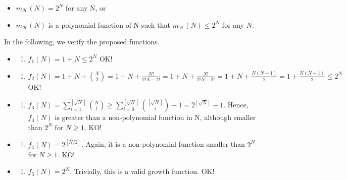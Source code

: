 \documentclass[11pt]{article}
\providecommand{\tightlist}{%
      \setlength{\itemsep}{0pt}\setlength{\parskip}{0pt}}
\begin{document}
\begin{itemize}
\tightlist
\item
  \(m_{\mathcal{H}}(N)= 2^N\) for any N, or
\item
  \(m_{\mathcal{H}}(N)\) is a polynomial function of N such that
  \(m_{\mathcal{H}}(N)\le 2^N\) for any \(N\).
\end{itemize}

In the following, we verify the proposed functions.

\begin{itemize}
\item
  \begin{enumerate}
  \def\labelenumi{\roman{enumi})}
  \tightlist
  \item
    \(f_1(N)=1+N \le 2^N\) OK!
  \end{enumerate}
\item
  \begin{enumerate}
  \def\labelenumi{\roman{enumi})}
  \setcounter{enumi}{1}
  \tightlist
  \item
    \(f_2(N)=1+N+{N\choose 2}=1+N+\frac{N!}{2!N-2!}=1+N+\frac{N!}{2!N-2!}=1+N+\frac{N(N-1)}{2}=1+\frac{N(N+1)}{2}\le 2^N\)
    OK!
  \end{enumerate}
\item
  \begin{enumerate}
  \def\labelenumi{\roman{enumi})}
  \setcounter{enumi}{2}
  \tightlist
  \item
    \(f_3(N)=\sum^{[\sqrt{N}]}_{i=1} {N\choose i} \ge \sum^{[\sqrt{N}]}_{i=0}{[\sqrt{N}]\choose i}-1=2^{[\sqrt{N}]}-1\).
    Hence, \(f_3(N)\) is greater than a non-polynomial function in N,
    although smaller than \(2^N\) for \(N\ge 1\). KO!
  \end{enumerate}
\item
  \begin{enumerate}
  \def\labelenumi{\roman{enumi})}
  \setcounter{enumi}{3}
  \tightlist
  \item
    \(f_4(N)=2^{[N/2]}\). Again, it is a non-polynomial function smaller
    than \(2^N\) for \(N\ge 1\). KO!
  \end{enumerate}
\item
  \begin{enumerate}
  \def\labelenumi{\alph{enumi})}
  \setcounter{enumi}{21}
  \tightlist
  \item
    \(f_5(N)=2^{N}\). Trivially, this is a valid growth function. OK!
  \end{enumerate}
\end{itemize}
\end{document}
